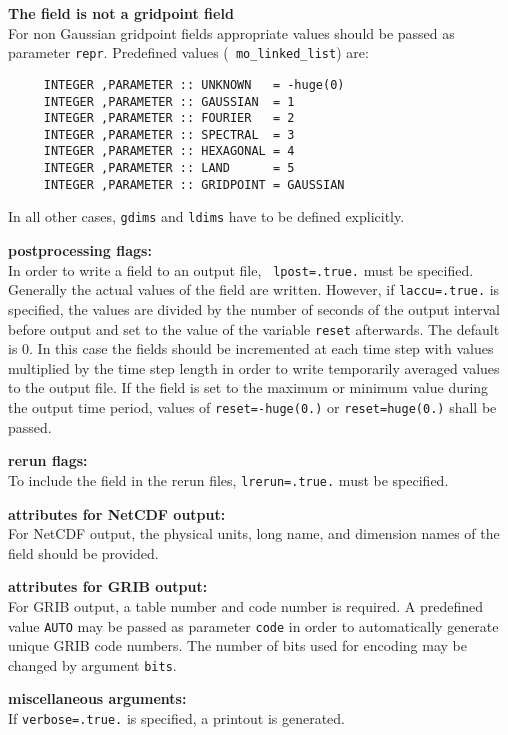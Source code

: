 \begin{description}
\begin{description}
  \item{\bf The field is not a gridpoint field}\\
    For non Gaussian gridpoint fields appropriate values should be
    passed as parameter {\tt repr}. Predefined values ({\tt
      mo\_linked\_list}) are:
  {\small
\begin{verbatim}
     INTEGER ,PARAMETER :: UNKNOWN   = -huge(0)
     INTEGER ,PARAMETER :: GAUSSIAN  = 1
     INTEGER ,PARAMETER :: FOURIER   = 2
     INTEGER ,PARAMETER :: SPECTRAL  = 3
     INTEGER ,PARAMETER :: HEXAGONAL = 4
     INTEGER ,PARAMETER :: LAND      = 5
     INTEGER ,PARAMETER :: GRIDPOINT = GAUSSIAN
  \end{verbatim}}
    In all other cases, {\tt gdims} and {\tt ldims} have to be defined
    explicitly.
  \end{description}  
\item{\bf postprocessing flags:}\\
  In order to write a field to an output file, {\tt
  lpost=.true.} must be specified. Generally the actual values of the
  field are written.  However, if {\tt laccu=.true.} is specified, the
  values are divided by the number of seconds of the output interval
  before output and set to the value of the variable {\tt reset}
  afterwards. The default is 0.
  In this case the fields should be incremented at
  each time step with values multiplied by the time step length in
  order to write temporarily averaged values to the output
  file. If the field is set to the maximum or
  minimum value during the output time period, values of
  {\tt reset=-huge(0.)} or {\tt reset=huge(0.)} shall be passed.
\item{\bf rerun flags:}\\
  To include the field in the rerun files, {\tt lrerun=.true.} must be
  specified.
\item{\bf attributes for NetCDF output:}\\
  For NetCDF output, the physical units, long name, and dimension
  names of the field should be provided.
\item{\bf attributes for GRIB output:}\\
  For GRIB output, a table number and code number is
  required. A predefined value {\tt AUTO} may be passed
  as parameter {\tt code} in order to automatically generate unique
  GRIB code numbers. The number of bits used for encoding may be
  changed by argument {\tt bits}.
\item{\bf miscellaneous arguments:}\\
  If {\tt verbose=.true.} is specified, a printout is generated.


\end{description}
